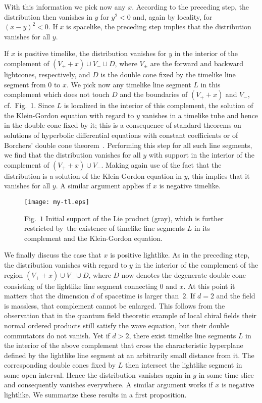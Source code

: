 \documentclass[11pt]{article}
\begin{document}
\medskip
With this information we pick now any $x$. According to the preceding step,
the distribution then vanishes in $y$ for $y^2 < 0$ and, again 
by locality, for $(x - y)^2 < 0$. If $x$ is spacelike, 
the preceding step implies that the distribution vanishes for all $y$.

\medskip 
If $x$ is positive timelike, the distribution vanishes for $y$ in the
interior of the complement
of $(V_+ + x) \cup V_- \cup D$, where $V_\pm$ are the
forward and backward lightcones, respectively,
and $D$ is the double cone
fixed by the timelike line segment from $0$ to $x$. We pick now any
timelike line segment $L$ in this complement which does not touch $D$ and 
the boundaries of $(V_+ + x)$ and $V_-$, cf.\ Fig.~1. Since $L$
is localized in the interior of this complement, the
solution of the Klein-Gordon equation with regard to $y$ vanishes
in a timelike tube and hence in
the double cone fixed by it; this is a
consequence of standard theorems
on solutions of hyperbolic differential equations with
constant coefficients \cite{CoHi} or of Borchers'
double cone theorem~\cite{Bo}. Performing this step for
all such line segments, we find that the distribution vanishes
for all $y$ with support in the interior of the complement of
$(V_+ + x) \cup V_-$. Making again use of the fact that
the distribution is a solution of the Klein-Gordon
equation in $y$, this implies that it vanishes for all $y$.
A similar argument applies if $x$ is negative timelike. 

\begin{figure}[h]
\centering
\texttt{[image: my-tl.eps]}
\caption*{\small
  Fig.\ $\! \! 1$ Initial support of the Lie product (gray), which
  is further restricted by~the exis\-tence of timelike line segments $L$
  in its complement and the Klein-Gordon equation.} 
\end{figure}

We finally discuss the case that $x$ is positive lightlike. 
As in the preceding step, the distribution 
vanishes with regard to $y$
in the interior of the
complement of the region $(V_+ + x) \cup V_- \cup D$,
where $D$ now denotes the degenerate double cone consisting of
the lightlike line segment connecting $0$ and $x$. At this
point it matters that the dimension $d$ of spacetime is larger
than~$2$. If $d=2$ and the
field is massless, that complement cannot be enlarged.
This follows from the observation that in the  
quantum field theoretic example of local chiral fields their   
normal ordered products still satisfy the wave equation, but their double
commutators do not vanish. Yet if
$d > 2$, there exist timelike line segments $L$ in the interior of the above
complement that cross the characteristic hyperplane
defined by the lightlike line segment at an arbitrarily small distance from it.
The corresponding double cones fixed by $L$ then intersect the
lightlike segment in some open interval. Hence the distribution
vanishes again in $y$ in some time slice and consequently
vanishes everywhere. A similar argument works if
$x$ is negative lightlike. We summarize these results in a
first proposition. 
\end{document}
